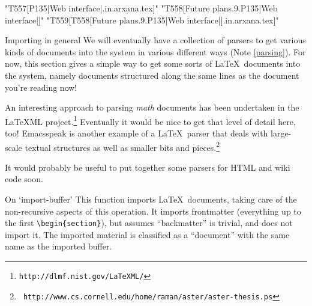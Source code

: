 \begin{idea}
"T557[P135|Web interface|.in.arxana.tex]"
"T558[Future plans.9.P135|Web interface|]"
"T559[T558[Future plans.9.P135|Web interface|].in.arxana.tex]"
\end{idea}

\begin{notate}{Importing in general} \label{importing-generally}
We will eventually have a collection of parsers to get
various kinds of documents into the system in various
different ways (Note \ref{parsing}).  For now, this
section gives a simple way to get some sorts of
\LaTeX\ documents into the system, namely documents
structured along the same lines as the document you're
reading now!

An interesting approach to parsing \emph{math} documents
has been undertaken in the \LaTeX ML
project.\footnote{{\tt http://dlmf.nist.gov/LaTeXML/}}
Eventually it would be nice to get that level of detail
here, too!  Emacsspeak is another example of a
\LaTeX\ parser that deals with large-scale textual
structures as well as smaller bits and
pieces.\footnote{{\tt
    http://www.cs.cornell.edu/home/raman/aster/aster-thesis.ps}}

It would probably be useful to put together some parsers
for HTML and wiki code soon.
\end{notate}

\begin{notate}{On `import-buffer'}
This function imports \LaTeX\ documents, taking care of
the non-recursive aspects of this operation.  It imports
frontmatter (everything up to the first
\verb+\begin{section}+), but assumes ``backmatter'' is
trivial, and does not import it.  The imported material is
classified as a ``document'' with the same name as the
imported buffer.
\end{notate}

